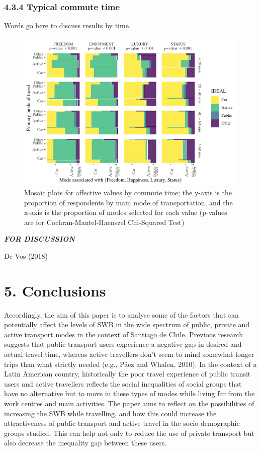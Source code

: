 \documentclass[]{elsarticle} %
\makeatletter
\def\maxwidth{\ifdim\Gin@nat@width>\linewidth\linewidth
\else\Gin@nat@width\fi}
\let\Oldincludegraphics\includegraphics
\renewcommand{\includegraphics}[1]{\Oldincludegraphics[width=\maxwidth]{#1}}
\makeatother
\begin{document}
\hypertarget{typical-commute-time-1}{%
\subsubsection{4.3.4 Typical commute
time}\label{typical-commute-time-1}}

Words go here to discuss results by time.

\begin{figure}
\centering
\includegraphics{Dissonance_Santiago_v1_files/figure-latex/figure-mosaic-plots-by-attribute-and-time-1.pdf}
\caption{\label{fig:mosaic-plots-by-travel-time}Mosaic plots for
affective values by commute time; the y-axis is the proportion of
respondents by main mode of transportation, and the x-axis is the
proportion of modes selected for each value (p-values are for
Cochran-Mantel-Haenszel Chi-Squared Test)}
\end{figure}

\textbf{\emph{FOR DISCUSSION}}

De Vos (2018)

\hypertarget{conclusions}{%
\section{5. Conclusions}\label{conclusions}}

Accordingly, the aim of this paper is to analyse some of the factors
that can potentially affect the levels of SWB in the wide spectrum of
public, private and active transport modes in the context of Santiago de
Chile. Previous research suggests that public transport users experience
a negative gap in desired and actual travel time, whereas active
travellers don't seem to mind somewhat longer trips than what strictly
needed (e.g., Páez and Whalen, 2010). In the context of a Latin American
country, historically the poor travel experience of public transit users
and active travellers reflects the social inequalities of social groups
that have no alternative but to move in these types of modes while
living far from the work centres and main activities. The paper aims to
reflect on the possibilities of increasing the SWB while travelling, and
how this could increase the attractiveness of public transport and
active travel in the socio-demographic groups studied. This can help not
only to reduce the use of private transport but also decrease the
inequality gap between these users.
\end{document}
